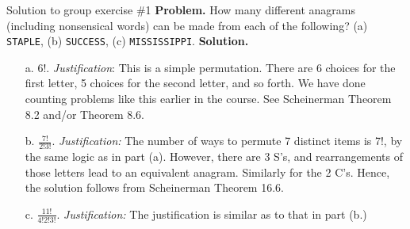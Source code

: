 \documentclass[10pt]{beamer}
\begin{document}
\begin{frame}{Solution to group exercise \#1}
\textbf{Problem.} How many different anagrams (including nonsensical words) can be made from each of the following? (a) \texttt{STAPLE}, (b)  \texttt{SUCCESS}, (c) \texttt{MISSISSIPPI}.
\vfill 
\textbf{Solution.}

\begin{itemize}
\item[a.] $6!$. \quad  \textit{Justification}:  This is a simple permutation.  There are 6 choices for the first letter, 5 choices for the second letter, and so forth. We have done counting problems like this earlier in the course.  See Scheinerman Theorem 8.2 and/or Theorem 8.6.    
\item[b.] $\frac{7!}{2!3!}$. \quad  \textit{Justification:}  The number of ways to permute 7 distinct items is 7!, by the same logic as in part (a).  However, there are 3 S's, and rearrangements of those letters lead to an equivalent anagram.  Similarly for the 2 C's.  Hence, the solution follows from Scheinerman Theorem 16.6. 
\item [c.] $\frac{11!}{4!2!3!}$.  \quad  \textit{Justification:} The justification is similar as to that in part (b.)
\end{itemize}
\end{frame}
\end{document}
